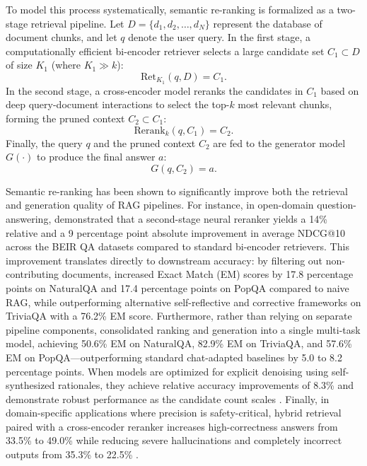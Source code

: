 To model this process systematically, semantic re-ranking is formalized as a two-stage retrieval pipeline. Let $D = \{d_1, d_2, \ldots, d_N\}$ represent the database of document chunks, and let $q$ denote the user query. In the first stage, a computationally efficient bi-encoder retriever selects a large candidate set $C_1 \subset D$ of size $K_1$ (where $K_1 \gg k$):
\begin{equation}
\text{Ret}_{K_1}(q, D) = C_1.
\end{equation}
In the second stage, a cross-encoder model reranks the candidates in $C_1$ based on deep query-document interactions to select the top-$k$ most relevant chunks, forming the pruned context $C_2 \subset C_1$:
\begin{equation}
\text{Rerank}_k(q, C_1) = C_2.
\end{equation}
Finally, the query $q$ and the pruned context $C_2$ are fed to the generator model $G(\cdot)$ to produce the final answer $a$:
\begin{equation}
G(q, C_2) = a.
\end{equation}


Semantic re-ranking has been shown to significantly improve both the retrieval and generation quality of RAG pipelines. For instance, in open-domain question-answering, \citet{moreira2024enhancing} demonstrated that a second-stage neural reranker yields a 14\% relative and a 9 percentage point absolute improvement in average NDCG@10 across the BEIR QA datasets compared to standard bi-encoder retrievers. This improvement translates directly to downstream accuracy: by filtering out non-contributing documents, \citet{wang2025infogain} increased Exact Match (EM) scores by 17.8 percentage points on NaturalQA and 17.4 percentage points on PopQA compared to naive RAG, while outperforming alternative self-reflective and corrective frameworks on TriviaQA with a 76.2\% EM score. Furthermore, rather than relying on separate pipeline components, \citet{yu2024rankrag} consolidated ranking and generation into a single multi-task model, achieving 50.6\% EM on NaturalQA, 82.9\% EM on TriviaQA, and 57.6\% EM on PopQA---outperforming standard chat-adapted baselines by 5.0 to 8.2 percentage points. When models are optimized for explicit denoising using self-synthesized rationales, they achieve relative accuracy improvements of 8.3\% and demonstrate robust performance as the candidate count scales \citep{wei2025instructrag}. Finally, in domain-specific applications where precision is safety-critical, hybrid retrieval paired with a cross-encoder reranker increases high-correctness answers from 33.5\% to 49.0\% while reducing severe hallucinations and completely incorrect outputs from 35.3\% to 22.5\% \citep{cheng2026enhancing}.

